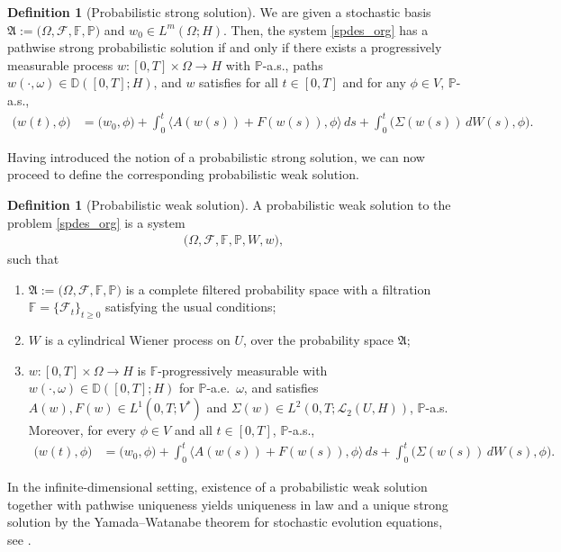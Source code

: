\documentclass[english,a4paper,11pt]{amsart}
\theoremstyle{plain}
\theoremstyle{definition}
\newtheorem{definition}[theorem]{Definition}
\theoremstyle{remark}
\numberwithin{equation}{section}
\newcommand{\Fcal} {{\mathcal F}}
\newcommand{\Lcal} {{\mathcal L}}
\newcommand{\Afrak} {{\mathfrak A}}
\renewcommand{\P}{\mathbb{P}}
\begin{document}
	\begin{definition}[Probabilistic strong solution]
		We are given a stochastic basis $\Afrak:=\big(\Omega,\Fcal,\mathbb{F},\P\big)$ and $w_0\in L^m(\Omega;H)$. Then, the system \eqref{spdes_org} has a pathwise strong probabilistic solution if and only if there exists a progressively measurable process $w:[0,T]\times \Omega\to H$ with $\P$-a.s., paths $w(\cdot,\omega)\in \mathbb{D}([0,T];H)$, and $w$ satisfies 
		for all $t\in[0,T]$ and for any $\phi\in V$, $\P$-a.s.,
		\begin{align*}
			\big(w(t),\phi\big)&=\big(w_0,\phi\big)+\int_0^t \langle A(w(s))+ F(w(s)), \phi\rangle \,ds+\int_0^t\big(\Sigma(w(s))\, dW(s),\phi\big).
		\end{align*}
	\end{definition}
	Having introduced the notion of a probabilistic strong solution, we can now proceed to define the corresponding probabilistic weak solution.
	\begin{definition}[Probabilistic weak solution]\label{def2.2}
		A probabilistic weak solution to the problem  \eqref{spdes_org} is a system 
		\begin{align*}
			\big(\Omega,\Fcal,\mathbb{F},\P, W,w \big), 
		\end{align*}such that 
		\begin{enumerate}
			\item $\Afrak:=\big(\Omega,\Fcal,\mathbb{F},\P\big)$ is a complete filtered probability space with a filtration $\mathbb{F}=\{\Fcal_t\}_{t\geq0}$ satisfying the usual conditions;
			\item $W$ is a cylindrical Wiener process on $U$, over the probability space $\Afrak$; 			
			\item {$w : [0,T]\times \Omega \to H$ is $\mathbb{F}$-progressively measurable with
			$w(\cdot,\omega)\in \mathbb{D}([0,T];H)$ for $\P$-a.e.\ $\omega$, and satisfies
			$A(w),F(w)\in L^{1}(0,T;V^{\ast})$ and
			$\Sigma(w)\in L^{2}(0,T;\Lcal_2(U,H))$, $\P$-a.s. Moreover, for every
			$\phi\in V$ and all $t\in[0,T]$, $\P$-a.s.,
			\begin{align*}
				\big(w(t),\phi\big)
				&=\big(w_0,\phi\big)
				+\int_0^t\langle A(w(s))+F(w(s)),\phi\rangle\,ds
				+\int_0^t\big(\Sigma(w(s))\,dW(s),\phi\big).
			\end{align*}}
		\end{enumerate}
	\end{definition}
{In the infinite-dimensional setting, existence of a probabilistic weak solution
together with pathwise uniqueness yields uniqueness in law and a unique strong
solution by the Yamada--Watanabe theorem for stochastic evolution equations, see
\cite{RSZ2008,Kurtz2007}.}
	
\end{document}
